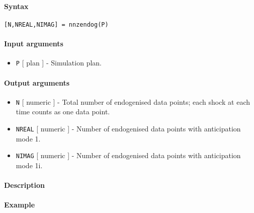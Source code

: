 


	\paragraph{Syntax}\label{syntax}

\begin{verbatim}
[N,NREAL,NIMAG] = nnzendog(P)
\end{verbatim}

\paragraph{Input arguments}\label{input-arguments}

\begin{itemize}
\itemsep1pt\parskip0pt
\item
  \texttt{P} {[} plan {]} - Simulation plan.
\end{itemize}

\paragraph{Output arguments}\label{output-arguments}

\begin{itemize}
\item
  \texttt{N} {[} numeric {]} - Total number of endogenised data points;
  each shock at each time counts as one data point.
\item
  \texttt{NREAL} {[} numeric {]} - Number of endogenised data points
  with anticipation mode 1.
\item
  \texttt{NIMAG} {[} numeric {]} - Number of endogenised data points
  with anticipation mode 1i.
\end{itemize}

\paragraph{Description}\label{description}

\paragraph{Example}\label{example}


